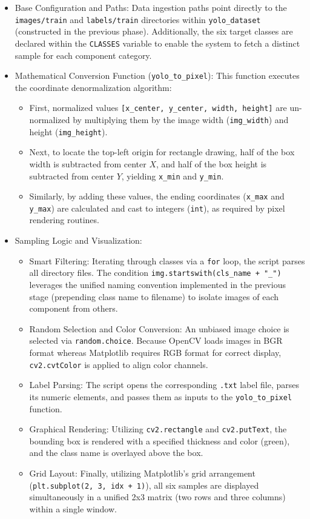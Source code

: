 \documentclass{article}
\begin{document}
\begin{itemize}
	\item Base Configuration and Paths: Data ingestion paths point directly to the \texttt{images/train} and \texttt{labels/train} directories within \texttt{yolo\_dataset} (constructed in the previous phase). Additionally, the six target classes are declared within the \texttt{CLASSES} variable to enable the system to fetch a distinct sample for each component category.
	\item Mathematical Conversion Function (\texttt{yolo\_to\_pixel}): This function executes the coordinate denormalization algorithm:
	\begin{itemize}
		\item First, normalized values \texttt{[x\_center, y\_center, width, height]} are un-normalized by multiplying them by the image width (\texttt{img\_width}) and height (\texttt{img\_height}).
		\item Next, to locate the top-left origin for rectangle drawing, half of the box width is subtracted from center $X$, and half of the box height is subtracted from center $Y$, yielding \texttt{x\_min} and \texttt{y\_min}.
		\item Similarly, by adding these values, the ending coordinates (\texttt{x\_max} and \texttt{y\_max}) are calculated and cast to integers (\texttt{int}), as required by pixel rendering routines.
	\end{itemize}
	\item Sampling Logic and Visualization:
	\begin{itemize}
		\item Smart Filtering: Iterating through classes via a \texttt{for} loop, the script parses all directory files. The condition \texttt{img.startswith(cls\_name + "\_")} leverages the unified naming convention implemented in the previous stage (prepending class name to filename) to isolate images of each component from others.
		\item Random Selection and Color Conversion: An unbiased image choice is selected via \texttt{random.choice}. Because OpenCV loads images in BGR format whereas Matplotlib requires RGB format for correct display, \texttt{cv2.cvtColor} is applied to align color channels.
		\item Label Parsing: The script opens the corresponding \texttt{.txt} label file, parses its numeric elements, and passes them as inputs to the \texttt{yolo\_to\_pixel} function.
		\item Graphical Rendering: Utilizing \texttt{cv2.rectangle} and \texttt{cv2.putText}, the bounding box is rendered with a specified thickness and color (green), and the class name is overlayed above the box.
		\item Grid Layout: Finally, utilizing Matplotlib's grid arrangement (\texttt{plt.subplot(2, 3, idx + 1)}), all six samples are displayed simultaneously in a unified 2x3 matrix (two rows and three columns) within a single window.
	\end{itemize}
\end{itemize}
\end{document}
